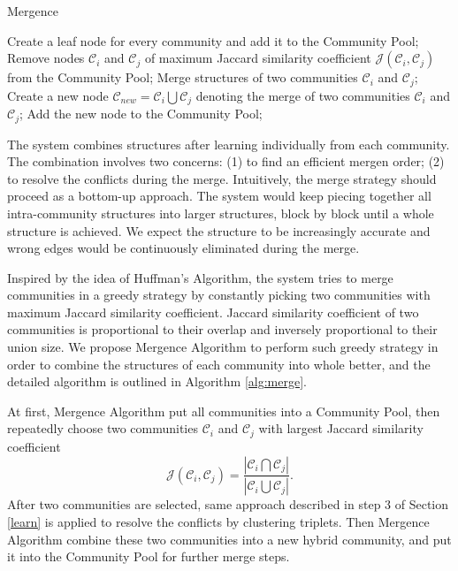 \begin{algorithm}
\caption{Mergence}
\label{alg:merge}
\begin{algorithmic}[1]
\State Create a leaf node for every community and add it to the Community Pool;
    \State Remove nodes $\mathcal {C}_{i}$ and $\mathcal {C}_{j}$ of maximum Jaccard similarity coefficient $\mathcal {J}(\mathcal {C}_{i}, \mathcal {C}_{j})$ from the Community Pool;
    \State Merge structures of two communities $\mathcal {C}_{i}$ and $\mathcal {C}_{j}$;
    \State Create a new node $\mathcal {C}_{new}=\mathcal {C}_{i}\bigcup \mathcal {C}_{j}$ denoting the merge of two communities $\mathcal {C}_{i}$ and $\mathcal {C}_{j}$;
    \State Add the new node to the Community Pool;
\EndWhile
\end{algorithmic}
\end{algorithm}

The \lama{} system combines structures after learning individually from each community. The combination involves two concerns: (1) to find an efficient mergen order; (2) to resolve the conflicts during the merge. Intuitively, the merge
strategy should proceed as a bottom-up approach. The \lama{} system would keep piecing together all intra-community structures into larger structures, block by block until a whole structure is achieved. We expect the structure to be increasingly accurate and wrong edges would be continuously eliminated during the merge.

Inspired by the idea of Huffman's Algorithm\cite{huf52}, the \lama{} system tries to merge communities in a greedy strategy by constantly picking
two communities with maximum Jaccard similarity coefficient\cite{jaccard}. Jaccard similarity coefficient\cite{jaccard} of two communities is proportional to their overlap and inversely proportional to their union size. We propose Mergence Algorithm to perform such greedy strategy in order to combine the structures of each community into whole better, and the detailed algorithm is outlined in Algorithm \ref{alg:merge}.

At first, Mergence Algorithm put all communities into a Community Pool, then repeatedly choose two communities $\mathcal {C}_{i}$ and $\mathcal {C}_{j}$ with largest Jaccard similarity coefficient
\[\mathcal {J}(\mathcal {C}_{i}, \mathcal {C}_{j})=\frac{\left | \mathcal {C}_{i}\bigcap \mathcal {C}_{j} \right |}{\left | \mathcal {C}_{i}\bigcup \mathcal {C}_{j}\right |}.\]
After two communities are selected, same approach described in step 3 of Section \ref{learn} is applied to resolve the conflicts by clustering triplets. Then Mergence Algorithm combine these two communities into a new hybrid community, and put it into the Community Pool for further merge steps.


